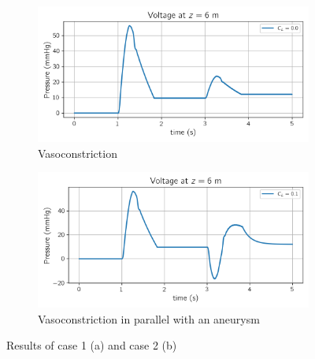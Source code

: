 \begin{figure}[! h]
\centering
\begin{subfigure}{.5\textwidth}
  \centering
  \includegraphics[width=\linewidth]{figures/PW_refl.png}
  \caption{Vasoconstriction}
  \label{fig:bv.refl}
\end{subfigure}%
\begin{subfigure}{.5\textwidth}
  \centering
  \includegraphics[width=\linewidth]{figures/PW_cap.png}
  \caption{Vasoconstriction in parallel with an aneurysm}
  \label{fig:bv.cap}
\end{subfigure}
\caption{Results of case 1 (a) and case 2 (b)}
\end{figure}

